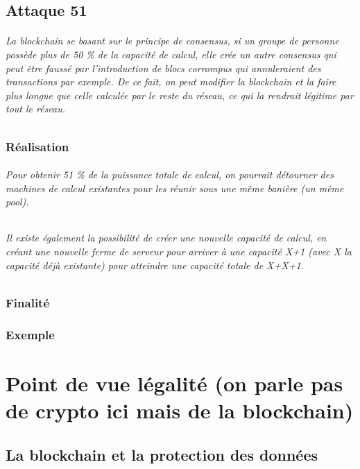 \documentclass[12pt, a4paper, oneside]{book}
\begin{document}
    \chapter{Attaque 51}
    \paragraph{La blockchain se basant sur le principe de consensus, si un groupe de personne possède plus de 50 \% de la capacité de calcul, elle crée un autre consensus qui peut être faussé par l'introduction de blocs corrompus qui annuleraient des transactions par exemple. De ce fait, on peut modifier la blockchain et la faire plus longue que celle calculée par le reste du réseau, ce qui la rendrait légitime par tout le réseau.}
    \section{Réalisation}
    \paragraph{Pour obtenir 51 \% de la puissance totale de calcul, on pourrait détourner des machines de calcul existantes pour les réunir sous une même banière (un même pool).}

    
    \paragraph{Il existe également la possibilité de créer une nouvelle capacité de calcul, en créant une nouvelle ferme de serveur pour arriver à une capacité X+1 (avec X la capacité déjà existante) pour atteindre une capacité totale de X+X+1.}
    \section{Finalité}
    \section{Exemple}

    \part{Point de vue légalité (on parle pas de crypto ici mais de la blockchain)}
    \chapter{La blockchain et la protection des données}
\end{document}
